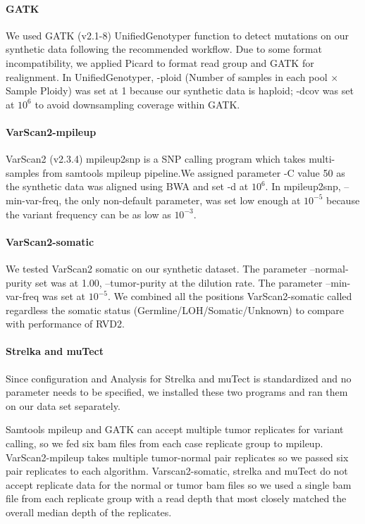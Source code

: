 \documentclass[11pt,reqno]{amsart}
\begin{document}
\paragraph{\textbf{GATK}}
We used GATK (v2.1-8) UnifiedGenotyper function to detect mutations on our synthetic data following the recommended workflow. Due to some format incompatibility, we applied Picard to format read group and GATK for realignment. In UnifiedGenotyper, -ploid (Number of samples in each pool $\times$ Sample Ploidy) was set at 1 because our synthetic data is haploid; -dcov was set at $10^6$ to avoid downsampling coverage within GATK.

\paragraph{\textbf{VarScan2-mpileup}}
VarScan2 (v2.3.4) mpileup2snp is a SNP calling program which takes multi-samples from samtools mpileup pipeline.We assigned parameter -C value 50 as the synthetic data was aligned using BWA and set -d at $10^6$. In mpileup2snp, --min-var-freq, the only non-default parameter, was set low enough at $10^{-5}$ because the variant frequency can be as low as $10^{-3}$.

\paragraph{\textbf{VarScan2-somatic}}
We tested VarScan2 somatic on our synthetic dataset. The parameter --normal-purity set was at 1.00, --tumor-purity at the dilution rate. The parameter --min-var-freq was set at $10^{-5}$. We combined all the positions VarScan2-somatic called regardless the somatic status (Germline/LOH/Somatic/Unknown) to compare with performance of RVD2.

\paragraph{\textbf{Strelka and muTect}}
Since configuration and Analysis for Strelka and muTect is standardized and no parameter needs to be specified, we installed these two programs and ran them on our data set separately.

Samtools mpileup and GATK can accept multiple tumor replicates for variant calling, so we fed six bam files from each case replicate group to mpileup. VarScan2-mpileup takes multiple tumor-normal pair replicates so we passed six pair replicates to each algorithm. Varscan2-somatic, strelka and muTect do not accept replicate data for the normal or tumor bam files so we used a single bam file from each replicate group with a read depth that most closely matched the overall median depth of the replicates.
\end{document}
